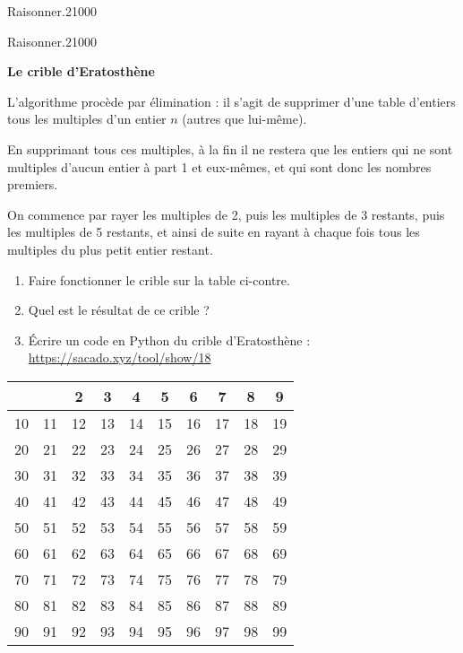 \begin{pageParcourst}
\begin{ExoCtN}{Raisonner.}{2}{1}{0}{0}{0}
\end{ExoCtN}

\begin{ExoCtN}{Raisonner.}{2}{1}{0}{0}{0}
 
 \begin{minipage}{0.5\linewidth} 
 
\textbf{Le crible d'Eratosthène}

L'algorithme procède par élimination : il s'agit de supprimer d'une table d'entiers tous les multiples d'un entier $n$ (autres que lui-même).

En supprimant tous ces multiples, à la fin il ne restera que les entiers qui ne sont multiples d'aucun entier à part 1 et eux-mêmes, et qui sont donc les nombres premiers.

On commence par rayer les multiples de 2, puis les multiples de 3 restants, puis les multiples de 5 restants, et ainsi de suite en rayant à chaque fois tous les multiples du plus petit entier restant.

\begin{enumerate}

\item Faire fonctionner le crible sur la table ci-contre.
\item Quel est le résultat de ce crible ? 

\item Écrire un code en Python du crible d'Eratosthène : \url{https://sacado.xyz/tool/show/18}

\end{enumerate}

\end{minipage}
\begin{minipage}{0.5\linewidth}

 


\begin{tabular}{|c|c|c|c|c|c|c|c|c|c|}
 \hline 
 &  & 2 & 3 & 4 & 5 & 6 & 7 & 8 & 9 \\ 
 \hline 
 10&11 & 12 & 13 & 14 & 15 & 16 & 17 & 18 & 19 \\
 \hline 
 20&21 & 22 & 23 & 24 & 25 & 26 & 27 & 28 & 29 \\
 \hline 
 30&31 & 32 & 33 & 34 & 35 & 36 & 37 & 38 & 39 \\
 \hline 
 40&41 & 42 & 43 & 44 & 45 & 46 & 47 & 48 & 49 \\
 \hline 
 50&51 & 52 & 53 & 54 & 55 & 56 & 57 & 58 & 59 \\
 \hline 
 60&61 & 62 & 63 & 64 & 65 & 66 & 67 & 68 & 69 \\
 \hline 
 70&71 & 72 & 73 & 74 & 75 & 76 & 77 & 78 & 79 \\
 \hline 
 80&81 & 82 & 83 & 84 & 85 & 86 & 87 & 88 & 89 \\
 \hline 
 90&91 & 92 & 93 & 94 & 95 & 96 & 97 & 98 & 99 \\
 \hline 
 \end{tabular}  
 

\end{minipage}
\end{ExoCtN}
\end{pageParcourst}
